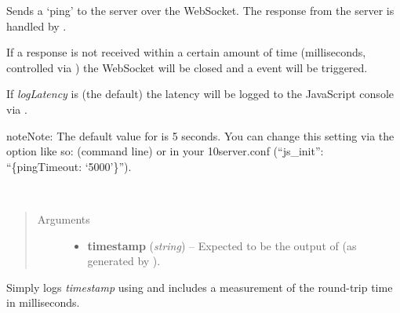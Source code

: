 \documentclass[letterpaper,10pt,openany]{sphinxmanual}
\begin{document}
\begin{fulllineitems}
\begin{fulllineitems}
\begin{fulllineitems}
\label{Developer/js_gateone:GateOne.Net.ping}
Sends a `ping' to the server over the WebSocket.  The response from the server is handled by {\hyperref[Developer/js_gateone:GateOne.Net.pong]{}}.

If a response is not received within a certain amount of time (milliseconds, controlled via ) the WebSocket will be closed and a  event will be triggered.

If \emph{logLatency} is  (the default) the latency will be logged to the JavaScript console via .

\begin{notice}{note}{Note:}
The default value for  is 5 seconds.  You can change this setting via the  option like so:  (command line) or in your 10server.conf (``js\_init'': ``\{pingTimeout: `5000'\}'').
\end{notice}

\end{fulllineitems}



\begin{fulllineitems}
\label{Developer/js_gateone:GateOne.Net.pong}~\begin{quote}\begin{description}
\item[{Arguments}] \leavevmode\begin{itemize}
\item {} 
\textbf{timestamp} (\emph{string}) -- Expected to be the output of  (as generated by {\hyperref[Developer/js_gateone:GateOne.Net.ping]{}}).

\end{itemize}

\end{description}\end{quote}

Simply logs \emph{timestamp} using  and includes a measurement of the round-trip time in milliseconds.

\end{fulllineitems}




\end{fulllineitems}
\end{fulllineitems}
\end{document}
